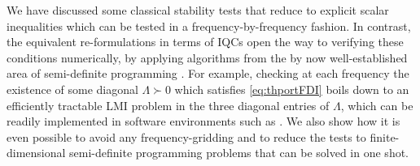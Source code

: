 We have discussed some classical stability tests that reduce to explicit scalar inequalities which can be tested in a frequency-by-frequency fashion. In contrast, the equivalent re-formulations in terms of IQCs open the way to verifying these conditions numerically, by applying algorithms from the by now well-established area of semi-definite programming \cite{lmiboydbook}. For example, checking at each frequency the existence of some diagonal $\Lambda\succ 0$ which satisfies \eqref{eq:thportFDI} boils down to an efficiently tractable LMI problem in the three diagonal entries of $\Lambda$, which can be readily implemented in software environments such as \cite{yalmip}. We also show how it is even possible to avoid any frequency-gridding and to reduce the tests to finite-dimensional semi-definite programming problems that can be solved in one shot.

